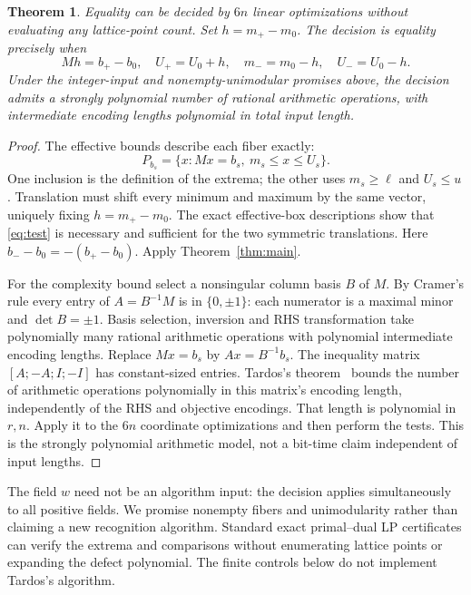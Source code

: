 \documentclass[11pt]{article}
\newtheorem{theorem}{Theorem}[section]
\begin{document}
\begin{theorem}\label{thm:alg}
Equality can be decided by \(6n\) linear optimizations without evaluating any lattice-point count. Set \(h=m_+-m_0\). The decision is equality precisely when
\begin{equation}\label{eq:test}
Mh=b_+-b_0,\quad U_+=U_0+h,\quad
m_-=m_0-h,\quad U_-=U_0-h.
\end{equation}
Under the integer-input and nonempty-unimodular promises above, the decision admits a strongly polynomial number of rational arithmetic operations, with intermediate encoding lengths polynomial in total input length.
\end{theorem}
\begin{proof}
The effective bounds describe each fiber exactly:
\[
P_{b_s}=\{x:Mx=b_s,\ m_s\le x\le U_s\}.
\]
One inclusion is the definition of the extrema; the other uses \(m_s\ge\ell\) and \(U_s\le u\).
Translation must shift every minimum and maximum by the same vector, uniquely fixing \(h=m_+-m_0\). The exact effective-box descriptions show that \eqref{eq:test} is necessary and sufficient for the two symmetric translations. Here \(b_--b_0=-(b_+-b_0)\).
Apply Theorem~\ref{thm:main}.

For the complexity bound select a nonsingular column basis \(B\) of \(M\). By Cramer's rule every entry of \(A=B^{-1}M\) is in \(\{0,\pm1\}\): each numerator is a maximal minor and \(\det B=\pm1\). Basis selection, inversion and RHS transformation take polynomially many rational arithmetic operations with polynomial intermediate encoding lengths.
Replace \(Mx=b_s\) by \(Ax=B^{-1}b_s\).
The inequality matrix \([A;-A;I;-I]\) has constant-sized entries. Tardos's theorem~\cite{Tardos} bounds the number of arithmetic operations polynomially in this matrix's encoding length, independently of the RHS and objective encodings. That length is polynomial in \(r,n\). Apply it to the \(6n\) coordinate optimizations and then perform the tests. This is the strongly polynomial arithmetic model, not a bit-time claim independent of input lengths.
\end{proof}

The field \(w\) need not be an algorithm input: the decision applies simultaneously to all positive fields. We promise nonempty fibers and unimodularity rather than claiming a new recognition algorithm. Standard exact primal--dual LP certificates can verify the extrema and comparisons without enumerating lattice points or expanding the defect polynomial. The finite controls below do not implement Tardos's algorithm.
\end{document}

